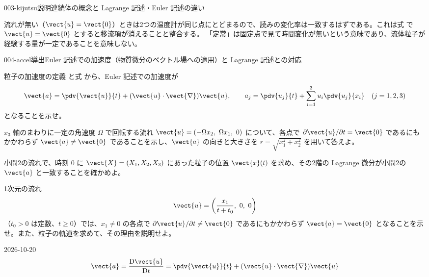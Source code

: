 \documentclass[uplatex,dvipdfmx,a4paper,11pt]{jsarticle}
\begin{document}
\begin{mondai}{003-kijutsu}{説明}{連続体の概念と Lagrange 記述・Euler 記述の違い}
\begin{tadashii}
\kenzan 流れが無い（$\vect{u} = \vect{0}$）ときは2つの温度計が同じ点にとどまるので、読みの変化率は一致するはずである。これは式  で $\vect{u} = \vect{0}$ とすると移流項が消えることと整合する。
\tsumazuki 「定常」は固定点で見て時間変化が無いという意味であり、流体粒子が経験する量が一定であることを意味しない。
\end{tadashii}
\end{mondai}

\begin{mondai}{004-accel}{導出}{Euler 記述での加速度（物質微分のベクトル場への適用）と Lagrange 記述との対応}
\begin{shoumon}
    \item 粒子の加速度の定義  と式  から、Euler 記述での加速度が
    \[ \vect{a} = \pdv{\vect{u}}{t} + (\vect{u}\cdot\vect{\nabla})\vect{u},\qquad a_j = \pdv{u_j}{t} + \sum_{i=1}^{3} u_i\pdv{u_j}{x_i}\quad (j=1,2,3) \]
    となることを示せ。
    \item $x_3$ 軸のまわりに一定の角速度 $\Omega$ で回転する流れ $\vect{u} = (-\Omega x_2,\ \Omega x_1,\ 0)$ について、各点で $\partial\vect{u}/\partial t = \vect{0}$ であるにもかかわらず $\vect{a} \neq \vect{0}$ であることを示し、$\vect{a}$ の向きと大きさを $r = \sqrt{x_1^{2}+x_2^{2}}$ を用いて答えよ。
    \item 小問2の流れで、時刻 0 に $\vect{X} = (X_1, X_2, X_3)$ にあった粒子の位置 $\vect{x}(t)$ を求め、その2階の Lagrange 微分が小問2の $\vect{a}$ と一致することを確かめよ。
    \item 1次元の流れ
    \[ \vect{u} = \left(\frac{x_1}{t+t_0},\ 0,\ 0\right) \]
    （$t_0>0$ は定数、$t\ge0$）では、$x_1\neq0$ の各点で $\partial\vect{u}/\partial t \neq \vect{0}$ であるにもかかわらず $\vect{a} = \vect{0}$ となることを示せ。また、粒子の軌道を求めて、その理由を説明せよ。
  \end{shoumon}
\begin{kotaeutsushi}{2026-10-20}
\[ \vect{a}=\frac{\mathrm{D}\vect{u}}{\mathrm{D}t}=\pdv{\vect{u}}{t}+(\vect{u}\cdot\vect{\nabla})\vect{u} \]

\end{kotaeutsushi}
\end{mondai}
\end{document}
